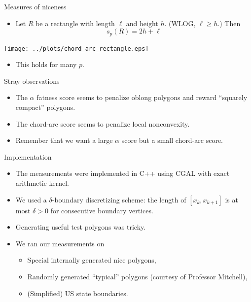 \documentclass[]{beamer}
\begin{document}
\begin{frame}[t]{Measures of niceness}
  \begin{itemize}
    \item Let $R$ be a rectangle with length $\ell$ and height $h$. (WLOG, $\ell
      \geq h$.) Then
      \begin{equation*}
        s_p(R) = 2h + \ell
      \end{equation*}
  \end{itemize}
  \begin{center}
    \texttt{[image: ../plots/chord\_arc\_rectangle.eps]}
  \end{center}
  \begin{itemize}
    \item This holds for many $p$.
  \end{itemize}
\end{frame}

\begin{frame}[t]{Stray observations}
  \begin{itemize}
    \item The $\alpha$ fatness score seems to penalize oblong polygons and
      reward ``squarely compact'' polygons.
    \item The chord-arc score seems to penalize local nonconvexity. 
    \item Remember that we want a large $\alpha$ score but a small chord-arc
      score.
  \end{itemize}
\end{frame}

\begin{frame}[t]{Implementation}
  \begin{itemize}
    \item The measurements were implemented in C++ using CGAL with exact
      arithmetic kernel.
    \item We used a $\delta$-boundary discretizing scheme: the length of $[x_k,
      x_{k+1}]$ is at most $\delta > 0$ for consecutive boundary vertices.
    \item Generating useful test polygons was tricky.
    \item We ran our measurements on
      \begin{itemize}
        \item Special internally generated nice polygons,
        \item Randomly generated ``typical'' polygons (courtesy of Professor
          Mitchell),
        \item (Simplified) US state boundaries.
      \end{itemize}
  \end{itemize}
\end{frame}
\end{document}
